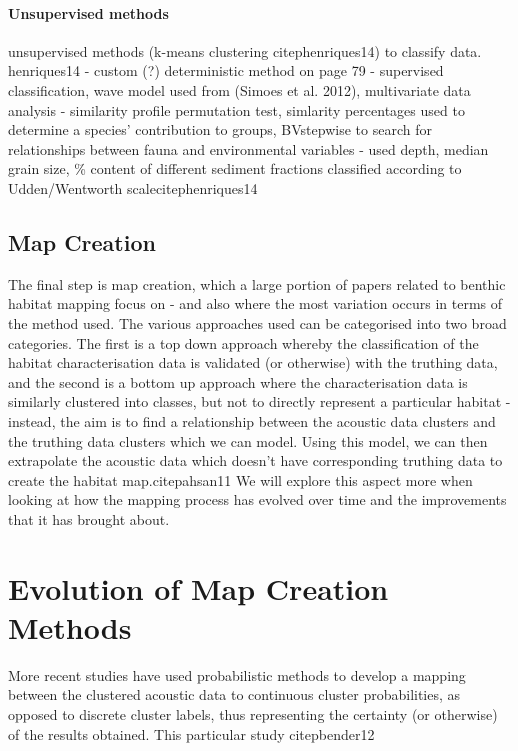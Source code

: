 \documentclass[12pt]{article}
\begin{document}
\begin{multicols}{2}
            \paragraph{Unsupervised methods}
            unsupervised methods (k-means clustering citep{henriques14}) to classify data.
            henriques14 - custom (?) deterministic method on page 79 - supervised classification, wave model used from (Simoes et al. 2012), multivariate data analysis - similarity profile permutation test, simlarity percentages used to determine a species' contribution to groups, BVstepwise to search for relationships between fauna and environmental variables - used depth, median grain size, \% content of different sediment fractions classified according to Udden/Wentworth scalecitep{henriques14}

            \subsection{Map Creation}
            The final step is map creation, which a large portion of papers related to benthic habitat mapping focus on - and also where the most variation occurs in terms of the method used. The various approaches used can be categorised into two broad categories. The first is a top down approach whereby the classification of the habitat characterisation data is validated (or otherwise) with the truthing data, and the second is a bottom up approach where the characterisation data is similarly clustered into classes, but not to directly represent a particular habitat - instead, the aim is to find a relationship between the acoustic data clusters and the truthing data clusters which we can model. Using this model, we can then extrapolate the acoustic data which doesn't have corresponding truthing data to create the habitat map.citep{ahsan11} We will explore this aspect more when looking at how the mapping process has evolved over time and the improvements that it has brought about.

            \section{Evolution of Map Creation Methods}

            More recent studies have used probabilistic methods to develop a mapping between the clustered acoustic data to continuous cluster probabilities, as opposed to discrete cluster labels, thus representing the certainty (or otherwise) of the results obtained. This particular study citep{bender12}


\end{multicols}
\end{document}
